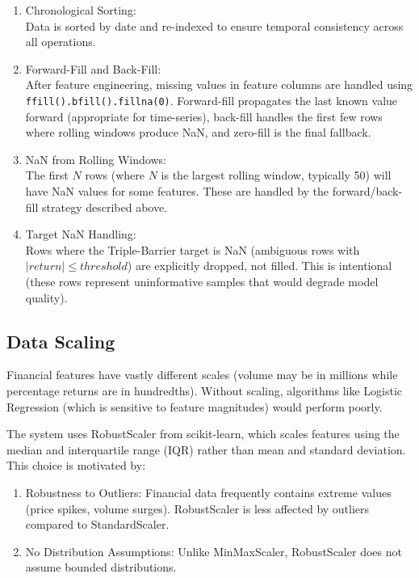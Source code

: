 \documentclass[12pt, a4paper]{report}
\begin{document}
	\vspace{-18pt}
	\begin{enumerate}
		\renewcommand{\labelenumi}{\roman{enumi}.}
		\item Chronological Sorting:\\
		Data is sorted by date and re-indexed to ensure temporal consistency across all operations.
		\item Forward-Fill and Back-Fill:\\
		After feature engineering, missing values in feature columns are handled using \texttt{ffill().bfill().fillna(0)}. Forward-fill propagates the last known value forward (appropriate for time-series), back-fill handles the first few rows where rolling windows produce NaN, and zero-fill is the final fallback.
		\item NaN from Rolling Windows:\\
		The first $N$ rows (where $N$ is the largest rolling window, typically 50) will have NaN values for some features. These are handled by the forward/back-fill strategy described above.
		\item Target NaN Handling:\\
		Rows where the Triple-Barrier target is NaN (ambiguous rows with $|return| \leq threshold$) are explicitly dropped, not filled. This is intentional (these rows represent uninformative samples that would degrade model quality).
	\end{enumerate}
	
	\subsection{Data Scaling}
	Financial features have vastly different scales (volume may be in millions while percentage returns are in hundredths). Without scaling, algorithms like Logistic Regression (which is sensitive to feature magnitudes) would perform poorly.
	
	The system uses RobustScaler from scikit-learn, which scales features using the median and interquartile range (IQR) rather than mean and standard deviation. This choice is motivated by:
	\vspace{-18pt}
	\begin{enumerate}
		\renewcommand{\labelenumi}{\roman{enumi}.}
		\item Robustness to Outliers: Financial data frequently contains extreme values (price spikes, volume surges). RobustScaler is less affected by outliers compared to StandardScaler.
		\item No Distribution Assumptions: Unlike MinMaxScaler, RobustScaler does not assume bounded distributions.
	\end{enumerate}
	
\end{document}

